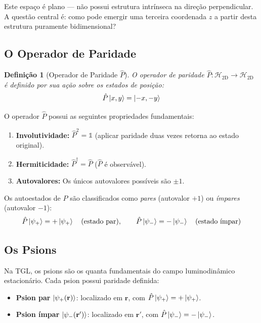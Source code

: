 \documentclass[12pt,a4paper,twoside]{article}
\newtheorem{definition}[theorem]{Defini\c{c}\~ao}
\newcommand{\psion}{\psi}
\begin{document}
Este espa\c{c}o \'e plano --- n\~ao possui estrutura intr\'inseca na dire\c{c}\~ao perpendicular. A quest\~ao central \'e: como pode emergir uma terceira coordenada $z$ a partir desta estrutura puramente bidimensional?

\subsection{O Operador de Paridade}

\begin{definition}[Operador de Paridade $\hat{P}$]
O operador de paridade $\hat{P}: \mathcal{H}_{2\text{D}} \to \mathcal{H}_{2\text{D}}$ \'e definido por sua a\c{c}\~ao sobre os estados de posi\c{c}\~ao:
\begin{equation}
\hat{P}\ket{x, y} = \ket{-x, -y}
\label{eq:paridade_def}
\end{equation}
\end{definition}

\noindent O operador $\hat{P}$ possui as seguintes propriedades fundamentais:

\begin{enumerate}[nosep,label=(\roman*)]
\item \textbf{Involutividade:} $\hat{P}^2 = \mathbb{1}$ (aplicar paridade duas vezes retorna ao estado original).
\item \textbf{Hermiticidade:} $\hat{P}^\dagger = \hat{P}$ ($\hat{P}$ \'e observ\'avel).
\item \textbf{Autovalores:} Os \'unicos autovalores poss\'iveis s\~ao $\pm 1$.
\end{enumerate}

\noindent Os autoestados de $\hat{P}$ s\~ao classificados como \textit{pares} (autovalor $+1$) ou \textit{\'impares} (autovalor $-1$):
\begin{equation}
\hat{P}\ket{\psion_+} = +\ket{\psion_+} \quad\text{(estado par)}, \qquad
\hat{P}\ket{\psion_-} = -\ket{\psion_-} \quad\text{(estado \'impar)}
\label{eq:autoestados_paridade}
\end{equation}

\subsection{Os Psions}

Na TGL, os psions s\~ao os quanta fundamentais do campo luminodin\^amico estacion\'ario. Cada psion possui paridade definida:

\begin{itemize}[nosep]
\item \textbf{Psion par} $\ket{\psion_+(\mathbf{r})}$: localizado em $\mathbf{r}$, com $\hat{P}\ket{\psion_+} = +\ket{\psion_+}$.
\item \textbf{Psion \'impar} $\ket{\psion_-(\mathbf{r}')}$: localizado em $\mathbf{r}'$, com $\hat{P}\ket{\psion_-} = -\ket{\psion_-}$.
\end{itemize}
\end{document}

